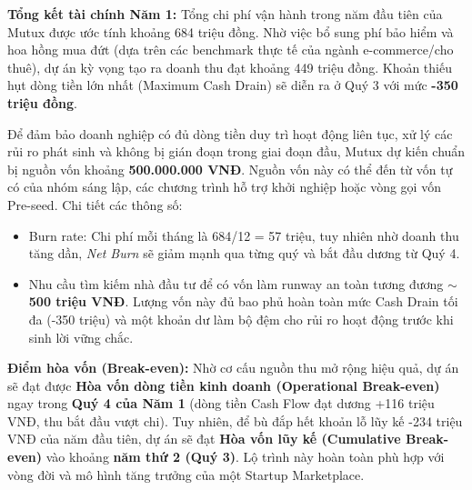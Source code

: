 \textbf{Tổng kết tài chính Năm 1:} 
Tổng chi phí vận hành trong năm đầu tiên của Mutux được ước tính khoảng 684 triệu đồng. Nhờ việc bổ sung phí bảo hiểm và hoa hồng mua đứt (dựa trên các benchmark thực tế của ngành e-commerce/cho thuê), dự án kỳ vọng tạo ra doanh thu đạt khoảng 449 triệu đồng. Khoản thiếu hụt dòng tiền lớn nhất (Maximum Cash Drain) sẽ diễn ra ở Quý 3 với mức \textbf{-350 triệu đồng}.

Để đảm bảo doanh nghiệp có đủ dòng tiền duy trì hoạt động liên tục, xử lý các rủi ro phát sinh và không bị gián đoạn trong giai đoạn đầu, Mutux dự kiến chuẩn bị nguồn vốn khoảng \textbf{500.000.000 VNĐ}. Nguồn vốn này có thể đến từ vốn tự có của nhóm sáng lập, các chương trình hỗ trợ khởi nghiệp hoặc vòng gọi vốn Pre-seed. Chi tiết các thông số:
\begin{itemize}
    \item Burn rate: Chi phí mỗi tháng là 684/12 = 57 triệu, tuy nhiên nhờ doanh thu tăng dần, \textit{Net Burn} sẽ giảm mạnh qua từng quý và bắt đầu dương từ Quý 4.
    \item Nhu cầu tìm kiếm nhà đầu tư để có vốn làm runway an toàn tương đương \textbf{$\sim$500 triệu VNĐ}. Lượng vốn này đủ bao phủ hoàn toàn mức Cash Drain tối đa (-350 triệu) và một khoản dư làm bộ đệm cho rủi ro hoạt động trước khi sinh lời vững chắc.
\end{itemize}

\textbf{Điểm hòa vốn (Break-even):} 
Nhờ cơ cấu nguồn thu mở rộng hiệu quả, dự án sẽ đạt được \textbf{Hòa vốn dòng tiền kinh doanh (Operational Break-even)} ngay trong \textbf{Quý 4 của Năm 1} (dòng tiền Cash Flow đạt dương +116 triệu VNĐ, thu bắt đầu vượt chi). 
Tuy nhiên, để bù đắp hết khoản lỗ lũy kế -234 triệu VNĐ của năm đầu tiên, dự án sẽ đạt \textbf{Hòa vốn lũy kế (Cumulative Break-even)} vào khoảng \textbf{năm thứ 2 (Quý 3)}. Lộ trình này hoàn toàn phù hợp với vòng đời và mô hình tăng trưởng của một Startup Marketplace.
